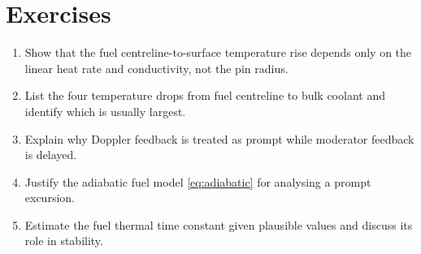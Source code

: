 \section*{Exercises}
\begin{enumerate}[leftmargin=*,itemsep=2pt]
\item Show that the fuel centreline-to-surface temperature rise depends only on the linear heat rate and conductivity, not the pin radius.
\item List the four temperature drops from fuel centreline to bulk coolant and identify which is usually largest.
\item Explain why Doppler feedback is treated as prompt while moderator feedback is delayed.
\item Justify the adiabatic fuel model \eqref{eq:adiabatic} for analysing a prompt excursion.
\item Estimate the fuel thermal time constant given plausible values and discuss its role in stability.
\end{enumerate}
